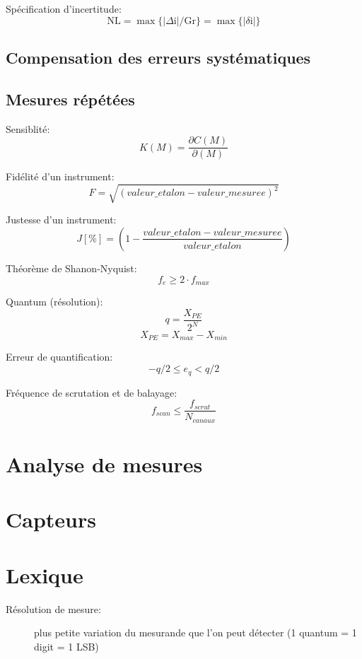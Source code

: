\documentclass[10pt, twocolumn]{article}
\begin{document}
			Spécification d'incertitude:
			\[\mathrm{NL}=\max \{|\Delta \mathrm{i}| / \mathrm{Gr}\}=\max \{|\delta \mathrm{i}|\}\]
			
		\subsection*{Compensation des erreurs systématiques}
		\subsection*{Mesures répétées}
			
			Sensiblité:
			\[K(M) = \frac{\partial C(M)}{\partial (M)}\]
			
			Fidélité d'un instrument:
			\[F = \sqrt{(valeur\_etalon - valeur\_mesuree)^{2}}\]
			
			Justesse d'un instrument:
			\[J [\%] = (1 - \frac{valeur\_etalon - valeur\_mesuree}{valeur\_etalon})\]
			
			Théorème de Shanon-Nyquist:
			\[f_{e} \geq 2 \cdot f_{max}\]
			
			Quantum (résolution):
			\[q = \frac{X_{PE}}{2^N}\]
			\[X_{PE} = X_{max}-X_{min}\]
			
			Erreur de quantification:
			\[-q/2 \leq e_q < q/2\]
			
			Fréquence de scrutation et de balayage:
			\[f_{scan} \leq \frac{f_{scrut}}{N_{canaux}}\]
			
	\section*{Analyse de mesures}
	\section*{Capteurs}
	\section*{Lexique}
	
		\begin{description}
		
			\item [Résolution de mesure:] plus petite variation du mesurande que l'on peut détecter (1 quantum = 1 digit = 1 LSB)
		\end{description}
		
		
\end{document}
